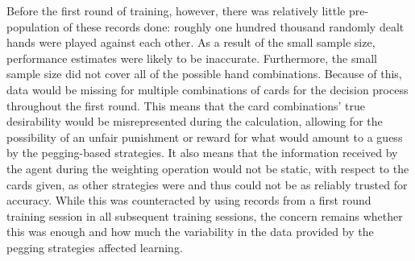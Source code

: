 Before the first round of training,
however,
there was relatively little pre-population of these records done:
roughly one hundred thousand randomly dealt hands were played against each
other.
%
As a result of the small sample size,
performance estimates were likely to be inaccurate.
%
Furthermore,
the small sample size did not cover all of the possible hand
combinations.
%
Because of this,
data would be missing for multiple combinations of cards
for the decision process
throughout the first round.
%
This means that the card combinations' true desirability would be
misrepresented during the calculation,
allowing for the possibility of an unfair
punishment or reward for what would amount to a guess by the
pegging-based strategies.
%
It also means that the information received by the agent during the weighting
operation would not be static, with respect to the cards given,
as other strategies were and thus could not be as
reliably trusted for accuracy.
%
While
this was counteracted by using records from a first round training session in 
all subsequent training sessions,
the concern remains whether this was enough
and how much the variability in the data provided by the pegging strategies
affected learning.

